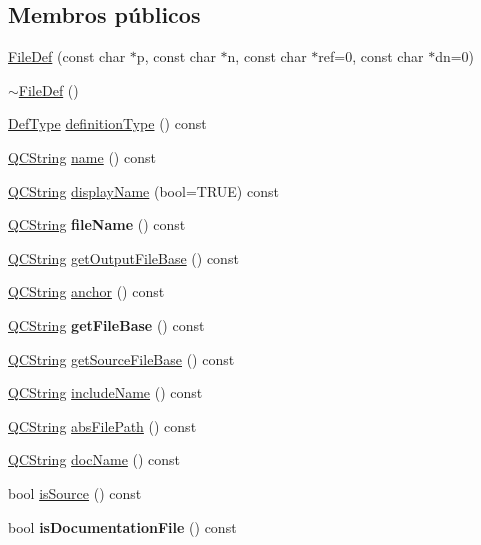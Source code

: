\subsection*{Membros públicos}
\begin{DoxyCompactItemize}
\item 
\hyperlink{class_file_def_acaabbab8536678caa09ba6c9414946ba}{File\-Def} (const char $\ast$p, const char $\ast$n, const char $\ast$ref=0, const char $\ast$dn=0)
\item 
\hyperlink{class_file_def_a5b5fa61b49fc6b2d797fd94363e0baf2}{$\sim$\-File\-Def} ()
\item 
\hyperlink{class_definition_intf_a2dc566dfec40397b2990e6520536ecb5}{Def\-Type} \hyperlink{class_file_def_aac410235a8bf90e471e649bd9dbf9c5e}{definition\-Type} () const 
\item 
\hyperlink{class_q_c_string}{Q\-C\-String} \hyperlink{class_file_def_af92302878527ec555ba9e3fe066925ff}{name} () const 
\item 
\hyperlink{class_q_c_string}{Q\-C\-String} \hyperlink{class_file_def_a67d09f414df966d11bbeba6298307bdf}{display\-Name} (bool=T\-R\-U\-E) const 
\item 
\hypertarget{class_file_def_a11c453b194f4619b5dedc0c80187a91f}{\hyperlink{class_q_c_string}{Q\-C\-String} {\bfseries file\-Name} () const }\label{class_file_def_a11c453b194f4619b5dedc0c80187a91f}

\item 
\hyperlink{class_q_c_string}{Q\-C\-String} \hyperlink{class_file_def_af72a982ba8198cd5c98e9fc850b71df6}{get\-Output\-File\-Base} () const 
\item 
\hyperlink{class_q_c_string}{Q\-C\-String} \hyperlink{class_file_def_acd17ae1d9600f864b1beb85dfb99a4f4}{anchor} () const 
\item 
\hypertarget{class_file_def_ad47efa4da31f60e593a236751d7e4733}{\hyperlink{class_q_c_string}{Q\-C\-String} {\bfseries get\-File\-Base} () const }\label{class_file_def_ad47efa4da31f60e593a236751d7e4733}

\item 
\hyperlink{class_q_c_string}{Q\-C\-String} \hyperlink{class_file_def_a0b24a407e5cd41328e5c64aac0884b6f}{get\-Source\-File\-Base} () const 
\item 
\hyperlink{class_q_c_string}{Q\-C\-String} \hyperlink{class_file_def_aaa4c35b205fb8f45538c090fa61fcf84}{include\-Name} () const 
\item 
\hyperlink{class_q_c_string}{Q\-C\-String} \hyperlink{class_file_def_a4c8aa83f34d2f4c3f126837545048793}{abs\-File\-Path} () const 
\item 
\hyperlink{class_q_c_string}{Q\-C\-String} \hyperlink{class_file_def_af8ec7b9a168991b847b3f00cae767c02}{doc\-Name} () const 
\item 
bool \hyperlink{class_file_def_a7e78a100e87f823c18b96902f0dadc3b}{is\-Source} () const 
\item 
\hypertarget{class_file_def_a4c659f1da0b253b765bd6039ac114198}{bool {\bfseries is\-Documentation\-File} () const }\label{class_file_def_a4c659f1da0b253b765bd6039ac114198}


\end{DoxyCompactItemize}
